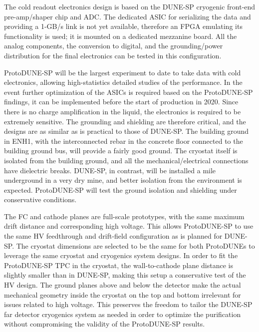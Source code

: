 The cold readout electronics design is based on the DUNE-SP cryogenic front-end pre-amp/shaper chip and ADC.  The dedicated ASIC for serializing the data and providing a 1-GB/s link is not yet available, therefore an FPGA emulating its functionality is used; it is mounted on a dedicated mezzanine board. All the analog components, the conversion to digital, and the grounding/power distribution for the final electronics can be tested in this configuration. 

ProtoDUNE-SP will be the largest experiment to date to take data with cold electronics, allowing high-statistics detailed studies of the performance. In the event further optimization of the ASICs is required based on the ProtoDUNE-SP findings, it can be implemented before the start of production in 2020. Since there is no charge amplification in the liquid, the electronics is required to be extremely sensitive. The grounding and shielding are therefore critical, and the designs are as similar as is practical to those of DUNE-SP. The building ground in ENH1, with the interconnected rebar in the concrete floor 
connected to the building ground bus, will provide a fairly good ground. The cryostat itself is isolated from the building ground, and all the mechanical/electrical connections have dielectric breaks. DUNE-SP, in contrast, will be installed a mile underground in a very dry mine, and better isolation from the environment is expected. ProtoDUNE-SP will test the ground isolation and shielding under conservative conditions.


The FC and cathode planes are full-scale prototypes, 
with the same maximum drift distance and corresponding high voltage.
This allows ProtoDUNE-SP to use the same HV feedthrough and drift-field configuration as is planned for DUNE-SP. The cryostat dimensions are selected to be the same for both ProtoDUNEs %
to leverage the same cryostat and cryogenics system designs. 
In order to fit the ProtoDUNE-SP TPC in the cryostat, the wall-to-cathode plane distance is slightly smaller than in DUNE-SP, making this setup a conservative test of the HV design. The ground planes above and below 
the detector make the actual mechanical geometry inside the 
cryostat on the top and bottom irrelevant for issues related to high voltage.  This preserves the freedom to tailor the DUNE-SP far detector cryogenics system as needed in order to optimize the purification without compromising the validity of the ProtoDUNE-SP results. %


